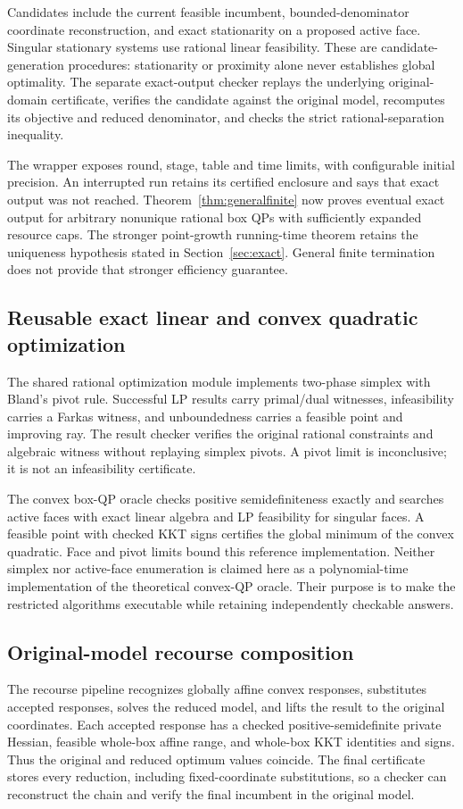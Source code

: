 Candidates include the current feasible incumbent, bounded-denominator
coordinate reconstruction, and exact stationarity on a proposed active
face. Singular stationary systems use rational linear feasibility.
These are candidate-generation procedures: stationarity or proximity
alone never establishes global optimality. The separate exact-output
checker replays the underlying original-domain certificate, verifies the
candidate against the original model, recomputes its objective and reduced
denominator, and checks the strict rational-separation inequality.

The wrapper exposes round, stage, table and time limits, with configurable
initial precision.
An interrupted run retains its certified enclosure and says that exact
output was not reached. Theorem~\ref{thm:generalfinite} now proves eventual exact output for
arbitrary nonunique rational box QPs with sufficiently expanded resource
caps. The stronger point-growth running-time theorem retains the
uniqueness hypothesis stated in Section~\ref{sec:exact}. General finite
termination does not provide that stronger efficiency guarantee.

\subsection{Reusable exact linear and convex quadratic optimization}
The shared rational optimization module implements two-phase simplex with
Bland's pivot rule. Successful LP results carry primal/dual witnesses,
infeasibility carries a Farkas witness, and unboundedness carries a feasible
point and improving ray. The result checker verifies the original rational
constraints and algebraic witness without replaying simplex pivots.
A pivot limit is inconclusive; it is not an infeasibility certificate.

The convex box-QP oracle checks positive semidefiniteness exactly and
searches active faces with exact linear algebra and LP feasibility for
singular faces. A feasible point with checked KKT signs certifies the global
minimum of the convex quadratic. Face and pivot limits bound this
reference implementation. Neither simplex nor active-face enumeration is
claimed here as a polynomial-time implementation of the theoretical
convex-QP oracle. Their purpose is to make the restricted algorithms
executable while retaining independently checkable answers.

\subsection{Original-model recourse composition}
The recourse pipeline recognizes globally affine convex responses,
substitutes accepted responses, solves the reduced model, and lifts the
result to the original coordinates. Each accepted response has a checked
positive-semidefinite private Hessian, feasible whole-box affine range,
and whole-box KKT identities and signs. Thus the original and reduced
optimum values coincide. The final certificate stores every reduction,
including fixed-coordinate substitutions, so a checker can reconstruct
the chain and verify the final incumbent in the original model.

